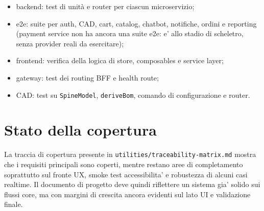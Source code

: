 \begin{itemize}
\item backend: test di unit\`a e router per ciascun microservizio;
\item e2e: suite per auth, CAD, cart, catalog, chatbot, notifiche, ordini e reporting (payment service non ha ancora una suite e2e: e' allo stadio di scheletro, senza provider reali da esercitare);
\item frontend: verifica della logica di store, composables e service layer;
\item gateway: test dei routing BFF e health route;
\item CAD: test su \texttt{SpineModel}, \texttt{deriveBom}, comando di configurazione e router.
\end{itemize}

\section{Stato della copertura}

La traccia di copertura presente in \texttt{utilities/traceability-matrix.md} mostra che i requisiti principali sono coperti, mentre restano aree di completamento soprattutto sul fronte UX, smoke test accessibilita' e robustezza di alcuni casi realtime. Il documento di progetto deve quindi riflettere un sistema gia' solido sui flussi core, ma con margini di crescita ancora evidenti sul lato UI e validazione finale.

